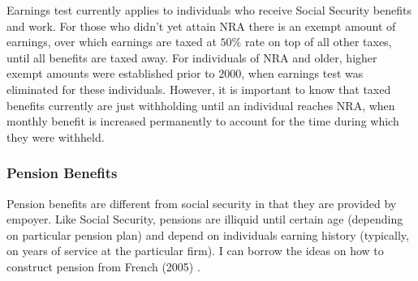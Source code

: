\documentclass[
10pt, %
a4paper, %
oneside, %
headinclude,footinclude, %
BCOR5mm, %
]{scrartcl}
\begin{document}
Earnings test currently applies to individuals who receive Social Security benefits and work. For those who didn't yet attain NRA there is an exempt amount of earnings, over which earnings are taxed at $50\%$ rate on top of all other taxes, until all benefits are taxed away. For individuals of NRA and older, higher exempt amounts were established prior to $2000$, when earnings test was eliminated for these individuals. However, it is important to know that taxed benefits currently are just withholding until an individual reaches  NRA, when monthly benefit is increased permanently to account for the time during which they were withheld.

\subsubsection{Pension Benefits}
Pension benefits are different from social security in that they are provided by empoyer. Like Social Security, pensions are illiquid until certain age (depending on particular pension plan) and depend on individuals earning history (typically, on years of service at the particular firm). I can borrow the ideas on how to construct pension from French (2005) \cite{French2005}.
\end{document}
